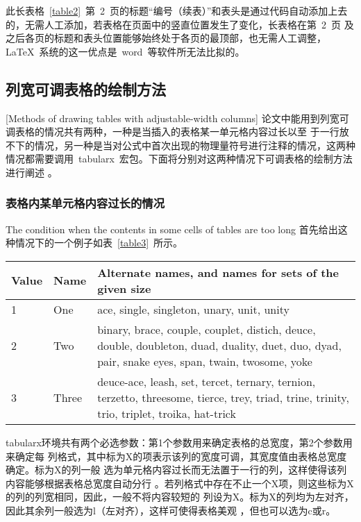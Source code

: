 此长表格~\ref{table2}~第~2~页的标题“编号（续表）”和表头是通过代码自动添加上去的，无需人工添加，若表格在页面中的竖直位置发生了变化，长表格在第~2~页
及之后各页的标题和表头位置能够始终处于各页的最顶部，也无需人工调整，\LaTeX~系统的这一优点是~word~等软件所无法比拟的。

\subsection{列宽可调表格的绘制方法}[Methods of drawing tables with adjustable-width columns]
论文中能用到列宽可调表格的情况共有两种，一种是当插入的表格某一单元格内容过长以至
于一行放不下的情况，另一种是当对公式中首次出现的物理量符号进行注释的情况，这两种
情况都需要调用~tabularx~宏包。下面将分别对这两种情况下可调表格的绘制方法进行阐述
。
\subsubsection{表格内某单元格内容过长的情况}{The condition when the contents in some cells of tables are too long}
首先给出这种情况下的一个例子如表~\ref{table3}~所示。
\begin{table}[htbp]
  \centering
{}\vspace{0.5em}\wuhao
\begin{tabularx}{0.7\textwidth}{llX}
\toprule[1.5pt]
Value & Name & Alternate names, and names for sets of the given size\\\midrule[1pt]
1 & One & ace, single, singleton, unary, unit, unity\\
2 & Two & binary, brace, couple, couplet, distich, deuce, double, doubleton, duad, duality, duet, duo, dyad, pair, snake eyes, span, twain, twosome, yoke\\
3 & Three & deuce-ace, leash, set, tercet, ternary, ternion, terzetto, threesome, tierce, trey, triad, trine, trinity, trio, triplet, troika, hat-trick\\\bottomrule[1.5pt]
\end{tabularx}
\end{table}
tabularx环境共有两个必选参数：第1个参数用来确定表格的总宽度，第2个参数用来确定每
列格式，其中标为X的项表示该列的宽度可调，其宽度值由表格总宽度确定。标为X的列一般
选为单元格内容过长而无法置于一行的列，这样使得该列内容能够根据表格总宽度自动分行
。若列格式中存在不止一个X项，则这些标为X的列的列宽相同，因此，一般不将内容较短的
列设为X。标为X的列均为左对齐，因此其余列一般选为l（左对齐），这样可使得表格美观
，但也可以选为c或r。

